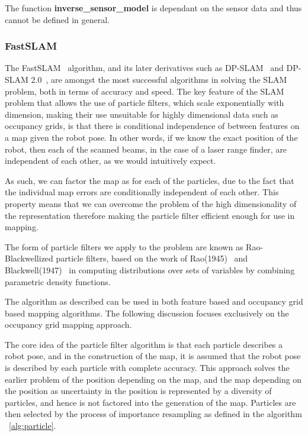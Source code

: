 \documentclass[english]{article}
\begin{document}
The function \textbf{inverse\_sensor\_model} is dependant on the sensor data and thus cannot be defined in general.

\subsubsection{FastSLAM}
The FastSLAM~\cite{fastslam} algorithm, and its later derivatives such as DP-SLAM~\cite{dpslam} and DP-SLAM 2.0~\cite{dpslam2}, are amongst the most successful algorithms in solving the SLAM problem, both in terms of accuracy and speed. The key feature of the SLAM problem that allows the use of particle filters, which scale exponentially with dimension, making their use unsuitable for highly dimensional data such as occupancy grids, is that there is conditional independence of between features on a map given the robot pose. In other words, if we know the exact position of the robot, then each of the scanned beams, in the case of a laser range finder, are independent of each other, as we would intuitively expect.

As such, we can factor the map as for each of the particles, due to the fact that the individual map errors are conditionally independent of each other. This property means that we can overcome the problem of the high dimensionality of the representation therefore making the particle filter efficient enough for use in mapping.

The form of particle filters we apply to the problem are known as Rao-Blackwellized particle filters, based on the work of Rao(1945)~\cite{rao} and Blackwell(1947)~\cite{blackwell} in computing distributions over sets of variables by combining parametric density functions.

The algorithm as described can be used in both feature based and occupancy grid based mapping algorithms. The following discussion focuses exclusively on the occupancy grid mapping approach.

The core idea of the particle filter algorithm is that each particle describes a robot pose, and in the construction of the map, it is assumed that the robot pose is described by each particle with complete accuracy. This approach solves the earlier problem of the position depending on the map, and the map depending on the position as uncertainty in the position is represented by a diversity of particles, and hence is not factored into the generation of the map. Particles are then selected by the process of importance resampling as defined in the algorithm ~\ref{alg:particle}.
\end{document}
